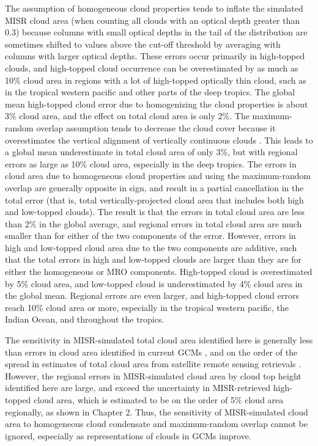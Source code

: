 The assumption of homogeneous cloud properties tends to inflate the
simulated MISR cloud area (when counting all clouds with an optical
depth greater than 0.3) because columns with small optical depths in the
tail of the distribution are sometimes shifted to values above the
cut-off threshold by averaging with columns with larger optical depths.
These errors occur primarily in high-topped clouds, and high-topped
cloud occurrence can be overestimated by as much as 10\% cloud area in
regions with a lot of high-topped optically thin cloud, such as in the
tropical western pacific and other parts of the deep tropics. The global
mean high-topped cloud error due to homogenizing the cloud properties is
about 3\% cloud area, and the effect on total cloud area is only 2\%.
The maximum-random overlap assumption tends to decrease the cloud cover
because it overestimates the vertical alignment of vertically continuous
clouds
\citep{mace_and_benson-troth_2002, hogan_and_illingworth_2000, barker_2008}.
This leads to a global mean underestimate in total cloud area of only
3\%, but with regional errors as large as 10\% cloud area, especially in
the deep tropics. The errors in cloud area due to homogeneous cloud
properties and using the maximum-random overlap are generally opposite
in sign, and result in a partial cancellation in the total error (that
is, total vertically-projected cloud area that includes both high and
low-topped clouds). The result is that the errors in total cloud area
are less than 2\% in the global average, and regional errors in total
cloud area are much smaller than for either of the two components of the
error. However, errors in high and low-topped cloud area due to the two
components are additive, such that the total errors in high and
low-topped clouds are larger than they are for either the homogeneous or
MRO components. High-topped cloud is overestimated by 5\% cloud area,
and low-topped cloud is underestimated by 4\% cloud area in the global
mean. Regional errors are even larger, and high-topped cloud errors
reach 10\% cloud area or more, especially in the tropical western
pacific, the Indian Ocean, and throughout the tropics.

The sensitivity in MISR-simulated total cloud area identified here is
generally less than errors in cloud area identified in current GCMs
\citep{kay_et_al_2012, klein_et_al_2013, bodas-salcedo_et_al_2011}, and
on the order of the spread in estimates of total cloud area from
satellite remote sensing retrievals
\citep{marchand_et_al_2010, pincus_et_al_2012}. However, the regional
errors in MISR-simulated cloud area by cloud top height identified here
are large, and exceed the uncertainty in MISR-retrieved high-topped
cloud area, which is estimated to be on the order of 5\% cloud area
regionally, as shown in Chapter 2. Thus, the sensitivity of
MISR-simulated cloud area to homogeneous cloud condensate and
maximum-random overlap cannot be ignored, especially as representations
of clouds in GCMs improve.


